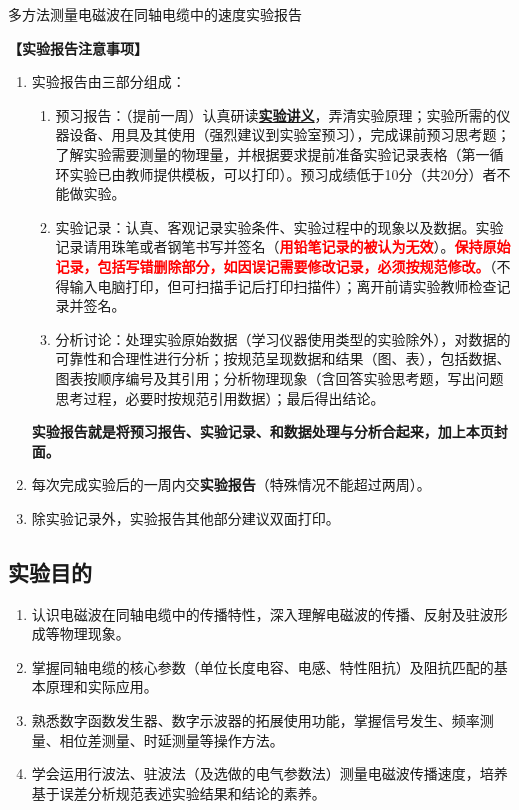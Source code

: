 \documentclass[dvipsnames, svgnames,a4paper,11pt]{article}
\begin{document}

\infoTable{\rule{2.5cm}{0.4pt}}{\rule{2.5cm}{0.4pt}}{\rule{2.5cm}{0.4pt}}{\rule{3cm}{0.4pt}}{\rule{3cm}{0.4pt}}{\rule{3cm}{0.4pt}}

\begin{center}
	\LARGE 多方法测量电磁波在同轴电缆中的速度\quad 实验报告
\end{center}
\textbf{【实验报告注意事项】}
\begin{enumerate}
	\item 实验报告由三部分组成：
	\begin{enumerate}
		\item 预习报告：（提前一周）认真研读\underline{\textbf{实验讲义}}，弄清实验原理；实验所需的仪器设备、用具及其使用（强烈建议到实验室预习），完成课前预习思考题；了解实验需要测量的物理量，并根据要求提前准备实验记录表格（第一循环实验已由教师提供模板，可以打印）。预习成绩低于10分（共20分）者不能做实验。
	    \item 实验记录：认真、客观记录实验条件、实验过程中的现象以及数据。实验记录请用珠笔或者钢笔书写并签名（\textcolor{red}{\textbf{用铅笔记录的被认为无效}}）。\textcolor{red}{\textbf{保持原始记录，包括写错删除部分，如因误记需要修改记录，必须按规范修改。}}（不得输入电脑打印，但可扫描手记后打印扫描件）；离开前请实验教师检查记录并签名。
	    \item 分析讨论：处理实验原始数据（学习仪器使用类型的实验除外），对数据的可靠性和合理性进行分析；按规范呈现数据和结果（图、表），包括数据、图表按顺序编号及其引用；分析物理现象（含回答实验思考题，写出问题思考过程，必要时按规范引用数据）；最后得出结论。
	\end{enumerate}
	\textbf{实验报告就是将预习报告、实验记录、和数据处理与分析合起来，加上本页封面。}
	\item 每次完成实验后的一周内交\textbf{实验报告}（特殊情况不能超过两周）。
	\item 除实验记录外，实验报告其他部分建议双面打印。
\end{enumerate}

\clearpage

\setcounter{section}{0}

\subsection{实验目的}
\begin{enumerate}
	\item 认识电磁波在同轴电缆中的传播特性，深入理解电磁波的传播、反射及驻波形成等物理现象。
	\item 掌握同轴电缆的核心参数（单位长度电容、电感、特性阻抗）及阻抗匹配的基本原理和实际应用。
	\item 熟悉数字函数发生器、数字示波器的拓展使用功能，掌握信号发生、频率测量、相位差测量、时延测量等操作方法。
	\item 学会运用行波法、驻波法（及选做的电气参数法）测量电磁波传播速度，培养基于误差分析规范表述实验结果和结论的素养。
\end{enumerate}
\end{document}
